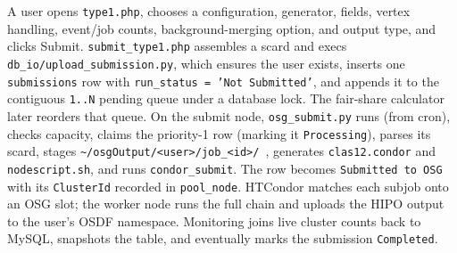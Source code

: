 A user opens \texttt{type1.\allowbreak{}php}, chooses a configuration, generator, fields, vertex handling,
event/job counts, background-merging option, and output type, and clicks Submit.
\texttt{submit\_\allowbreak{}type1.\allowbreak{}php} assembles a scard and execs
\texttt{db\_\allowbreak{}io/\allowbreak{}upload\_\allowbreak{}submission.\allowbreak{}py}, which ensures the
user exists, inserts one \texttt{submissions} row with \texttt{run\_\allowbreak{}status =\allowbreak{} 'Not
Submitted'}, and appends it to the contiguous \texttt{1.\allowbreak{}.\allowbreak{}N} pending queue under a
database lock. The fair-share calculator later reorders that queue. On the submit node,
\texttt{osg\_\allowbreak{}submit.\allowbreak{}py} runs (from cron), checks capacity, claims the priority-1 row
(marking it \texttt{Processing}), parses its scard, stages
\texttt{\textasciitilde{}/\allowbreak{}osgOutput/\allowbreak{}<user>/\allowbreak{}job\_\allowbreak{}<id>/%
\allowbreak{}}, generates \texttt{clas12.\allowbreak{}condor} and \texttt{nodescript.\allowbreak{}sh}, and runs
\texttt{condor\_\allowbreak{}submit}. The row becomes \texttt{Submitted to OSG} with its \texttt{ClusterId}
recorded in \texttt{pool\_\allowbreak{}node}. HTCondor matches each subjob onto an OSG slot; the worker node
runs the full chain and uploads the HIPO output to the user's OSDF namespace. Monitoring joins live cluster
counts back to MySQL, snapshots the table, and eventually marks the submission \texttt{Completed}.

